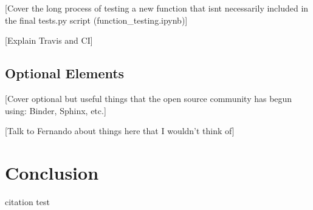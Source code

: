 \documentclass[12pt]{article}
\begin{document}
\textcolor{BrickRed}{[Cover the long process of testing a new function that isnt necessarily included in the final tests.py script (function\_testing.ipynb)]}

\textcolor{BrickRed}{[Explain Travis and CI]}

\subsection{Optional Elements}
\textcolor{BrickRed}{[Cover optional but useful things that the open source community has begun using: Binder, Sphinx, etc.]}

\textcolor{BrickRed}{[Talk to Fernando about things here that I wouldn't think of]}


\newpage
\section{Conclusion}

\newpage
citation test \cite{wooldridge, lasso, IV_orig}



\end{document}

